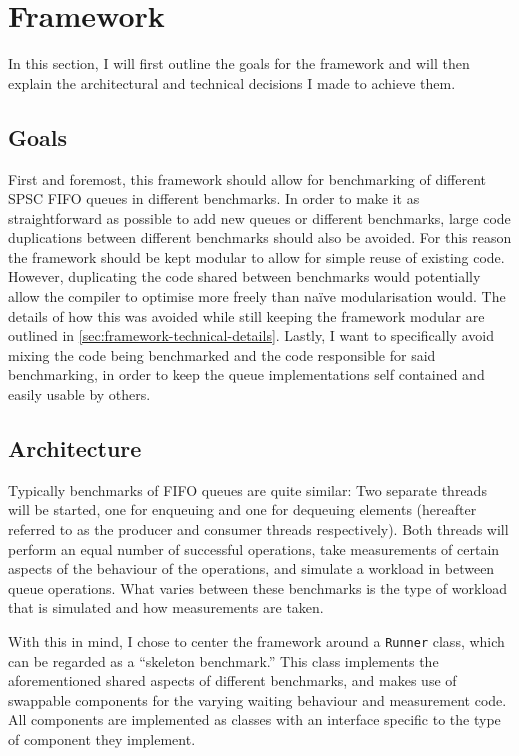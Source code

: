 \section{Framework}
\label{sec:framework}
In this section, I will first outline the goals for the framework and will then explain the
architectural and technical decisions I made to achieve them.

\subsection{Goals}
First and foremost, this framework should allow for benchmarking of different SPSC FIFO queues in different benchmarks.
In order to make it as straightforward as possible to add new queues or different benchmarks, large code
duplications between different benchmarks should also be avoided.
For this reason the framework should be kept modular to allow for simple reuse of existing code.
However, duplicating the code shared between benchmarks would potentially allow the compiler to optimise more
freely than na\"ive modularisation would. The details of how this was avoided while still keeping the
framework modular are outlined in \autoref{sec:framework-technical-details}.
Lastly, I want to specifically avoid mixing the code being benchmarked and the code responsible for said
benchmarking, in order to keep the queue implementations self contained and easily usable by others.

\subsection{Architecture}
Typically benchmarks of FIFO queues are quite similar\cite{EQueue,B-Queue,MCRingBuffer}:
Two separate threads will be started, one for enqueuing and one for dequeuing elements
(hereafter referred to as the producer and consumer threads respectively).
Both threads will perform an equal number of successful operations, take measurements of certain
aspects of the behaviour of the operations, and simulate a workload in between queue operations.
What varies between these benchmarks is the type of workload that is simulated and how measurements are taken.

With this in mind, I chose to center the framework around a \texttt{Runner} class, which can be regarded as a
``skeleton benchmark.''
This class implements the aforementioned shared aspects of different benchmarks, and makes use of swappable
components for the varying waiting behaviour and measurement code.
All components are implemented as classes with an interface specific to the type of component they implement.

